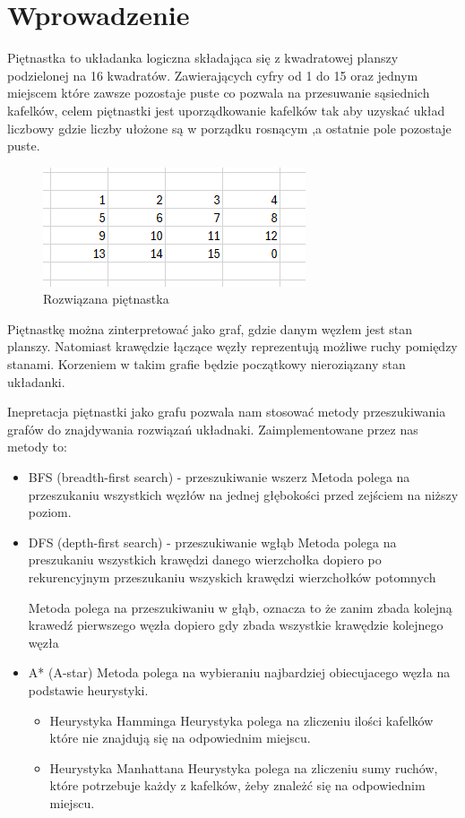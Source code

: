 \documentclass{classrep}
\begin{document}
    \section{Wprowadzenie}
    {
        Piętnastka to układanka logiczna składająca się z kwadratowej
        planszy podzielonej na 16 kwadratów. Zawierających cyfry od 1 do 15 oraz jednym miejscem które zawsze pozostaje puste
        co pozwala na przesuwanie sąsiednich kafelków, celem piętnastki jest uporządkowanie kafelków tak aby uzyskać układ liczbowy
    gdzie liczby ułożone są w porządku rosnącym ,a ostatnie pole pozostaje puste.

        \begin{figure}
            \centering
            \includegraphics{15}
            \caption{Rozwiązana piętnastka}
            \label{fig:Rozwiązana piętnastka}
        \end{figure}

        Piętnastkę można zinterpretować jako graf, gdzie danym węzłem jest stan planszy. Natomiast krawędzie łączące węzły
    reprezentują możliwe ruchy pomiędzy stanami. Korzeniem w takim grafie będzie początkowy nieroziązany stan układanki.

    Inepretacja piętnastki jako grafu pozwala nam stosować metody przeszukiwania grafów do znajdywania rozwiązań układnaki.
    Zaimplementowane przez nas metody to:
        \begin{itemize}
            \item BFS (breadth-first search) - przeszukiwanie wszerz
            Metoda polega na przeszukaniu wszystkich węzłów na jednej głębokości przed zejściem na niższy poziom.
            \item DFS (depth-first search) - przeszukiwanie wgłąb
            Metoda polega na preszukaniu wszystkich krawędzi danego wierzchołka dopiero po rekurencyjnym przeszukaniu
            wszyskich krawędzi wierzchołków potomnych

            Metoda polega na przeszukiwaniu w głąb, oznacza to że zanim zbada kolejną krawedź pierwszego węzła
            dopiero gdy zbada wszystkie krawędzie kolejnego węzła
            \item A* (A-star)
            Metoda polega na wybieraniu najbardziej obiecujacego węzła na podstawie heurystyki.
            \begin{itemize}
                \item Heurystyka Hamminga
                Heurystyka polega na zliczeniu ilości kafelków które nie znajdują się na odpowiednim miejscu.
                \item Heurystyka Manhattana
                Heurystyka polega na zliczeniu sumy ruchów, które potrzebuje każdy z kafelków, żeby znależć się na odpowiednim miejscu.
            \end{itemize}
        \end{itemize}

}
\end{document}
